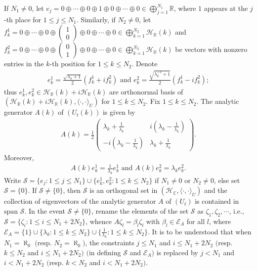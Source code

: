\documentclass[12pt, a4paper,reqno]{amsart}
\theoremstyle{definition}
\renewcommand{\leq}{\leqslant}
\def\C{\mathbb C}
\def\R{\mathbb R}
\newcommand{\CH}{\mathcal{H}}
\newcommand{\CS}{\mathcal{S}}
\begin{document}
If $N_1\neq 0$, let $e_j=0\oplus\cdots\oplus 0\oplus 1\oplus 0\oplus\cdots\oplus 0\in \bigoplus_{j=1}^{N_1}\R$, where $1$ appears at the $j$-th place for $1\leq j\leq N_1$. Similarly, if $N_2\neq 0$, let $f_k^1=0\oplus\cdots\oplus 0\oplus\left( \begin{matrix}1\\0 \end{matrix}\right)\oplus 0\oplus\cdots \oplus 0\in\bigoplus_{k=1}^{N_2}\CH_\R(k)$ and $f_k^2 =0\oplus\cdots\oplus 0\oplus\left( \begin{matrix}0\\1\end{matrix}\right)\oplus 0\oplus\cdots \oplus 0\in \bigoplus_{k=1}^{N_2}\CH_\R(k)$ be vectors with nonzero entries in the $k$-th position for $1\leq k\leq N_2$. Denote 
\begin{align*}
e^1_k= \frac{\sqrt{\lambda_k +1}}{2}(f_k^1+if_k^2) \text{ and }e^2_k=\frac{\sqrt{{\lambda}^{-1}_k+1}}{2}(f_k^1-if_k^2);
\end{align*}
thus $e_k^1,e_k^2 \in\CH_\R(k)+i\CH_\R(k)$ are orthonormal basis of $(\CH_\R(k)+i\CH_\R(k),\langle\cdot,\cdot\rangle_{U})$ for $1\leq k\leq N_2$. Fix $1\leq k\leq N_2$. The analytic generator $A(k)$ of $(U_t(k))$ is given by 
\begin{align*}
A(k)=\frac{1}{2}\left( \begin{matrix} \lambda_k + \frac{1}{\lambda_k} & i(\lambda_k - \frac{1}{\lambda_k})\\
		-i(\lambda_k -\frac{1}{ \lambda_k}) &\lambda_k + \frac{1}{\lambda_k}
\end{matrix}\right).
\end{align*}
Moreover, 
\begin{align*}
A(k) e_k^1 = \frac{1}{\lambda_k} e_k^1  \text{ and }  A(k) e_k^2 = \lambda_k e_k^2.
\end{align*}
Write $\CS=\{e_j: 1\leq j\leq N_1\} \cup \{e_k^1,e_k^2: 1\leq k\leq N_2\}$ if $N_1\neq 0$ or $N_2\neq 0$, else set $\CS=\{0\}$. If $\CS\neq \{0\}$, then $\CS$ is an orthogonal set in $(\CH_\C, \langle \cdot, \cdot\rangle_U)$ and the collection of eigenvectors of the analytic generator $A$ of $(U_t)$ is contained in $\text{span }\CS$. In the event $\CS\neq \{0\}$, 
rename the elements of the set $\CS$ as $\zeta_1,\zeta_2,\cdots$, i.e., $\CS=\{\zeta_i:1\leq i\leq N_1+2N_2\}$, whence $A\zeta_l=\beta_l\zeta_l$ with $\beta_l\in\mathcal{E}_A$ for all $l$, where $\mathcal{E}_A=\{1\}\cup \{\lambda_k:1\leq k\leq N_2\}\cup \{\frac{1}{\lambda_k}:1\leq k\leq N_2\}$. It is to be understood that when $N_1=\aleph_0$ $($resp. $N_2=\aleph_0)$, the constraints $j\leq N_1$ and $i\leq N_1+2N_2$ $($resp. $k\leq N_2$ and $i\leq N_1+2N_2)$ $($in defining $\CS$ and $\mathcal{E}_A)$ is replaced by $j<N_1$ and $i<N_1+2N_2$ $($resp.  $k<N_2$ and $i<N_1+2N_2)$. 
\end{document}
